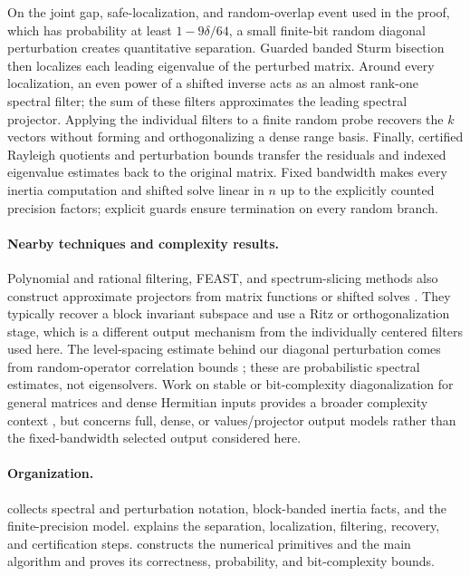 \documentclass[11pt]{article}
\begin{document}
On the joint gap, safe-localization, and random-overlap event used in the
proof, which has probability at least $1-9\delta/64$, a small finite-bit
random diagonal perturbation creates quantitative separation.  Guarded
banded Sturm bisection then localizes each leading eigenvalue of the
perturbed matrix.  Around every localization, an even power of a shifted
inverse acts as an almost rank-one spectral filter; the sum of these filters
approximates the leading spectral projector.  Applying the individual
filters to a finite random probe recovers the $k$ vectors without forming and
orthogonalizing a dense range basis.  Finally, certified Rayleigh quotients
and perturbation bounds transfer the residuals and indexed eigenvalue
estimates back to the original matrix.  Fixed bandwidth makes every inertia
computation and shifted solve linear in $n$ up to the explicitly counted
precision factors; explicit guards ensure termination on every random
branch.

\paragraph{Nearby techniques and complexity results.}
Polynomial and rational filtering, FEAST, and spectrum-slicing methods also
construct approximate projectors from matrix functions or shifted solves
\cite{tangPolizzi2014FEAST,liEtAl2016ThickRestartFiltering,xiSaad2016LeastSquaresRationalFilters,liEtAl2019EVSL}.
They typically recover a block invariant subspace and use a Ritz or
orthogonalization stage, which is a different output mechanism from the
individually centered filters used here.  The level-spacing estimate behind
our diagonal perturbation comes from random-operator correlation bounds
\cite{bellissardHislopStolz2007CorrelationEstimates}; these are probabilistic
spectral estimates, not eigensolvers.  Work on stable or bit-complexity
diagonalization for general matrices and dense Hermitian inputs provides a
broader complexity context
\cite{banksEtAl2023PseudospectralShattering,shah2025HermitianDiagonalization,sobczyk2025HermitianEigenproblems},
but concerns full, dense, or values/projector output models rather than the
fixed-bandwidth selected output considered here.

\paragraph{Organization.}
 collects spectral and perturbation notation,
block-banded inertia facts, and the finite-precision model.
 explains the separation, localization, filtering,
recovery, and certification steps.   constructs the numerical
primitives and the main algorithm and proves its correctness, probability,
and bit-complexity bounds.
\end{document}
